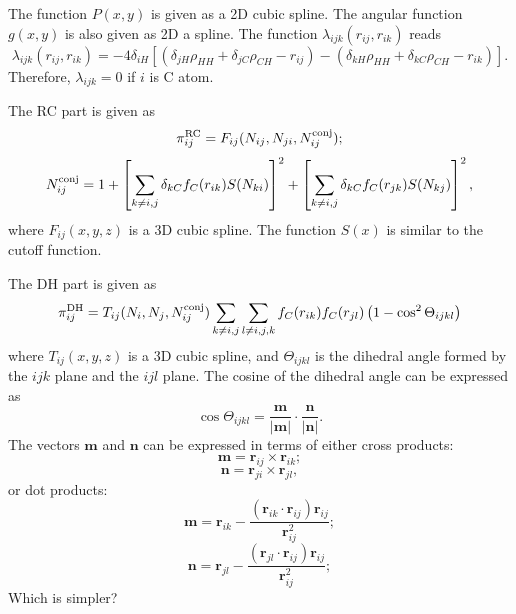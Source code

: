 \documentclass[12pt,a4paper]{report}
\newcommand{\vect}[1]{\boldsymbol{#1}}
\begin{document}
The function $P(x,y)$ is given as a 2D cubic spline. The angular function $g(x,y)$  is also given as 2D a spline. 
The function $\lambda_{ijk}(r_{ij},r_{ik})$ reads
\begin{equation}
\lambda_{ijk}(r_{ij},r_{ik}) =- 4\delta_{iH} 
\left[
  (\delta_{jH}\rho_{HH} + \delta_{jC}\rho_{CH} - r_{ij}) -
  (\delta_{kH}\rho_{HH} + \delta_{kC}\rho_{CH} - r_{ik})
\right].
\end{equation}
Therefore, $\lambda_{ijk}=0$ if $i$ is C atom.

The RC part is given as
\begin{equation}
\pi_{ij}^{\rm RC} = F_{ij}(N_{ij},N_{ji},N_{ij}^{\rm conj});
\end{equation}
\begin{equation}
N_{ij}^{\rm conj} = 1 + 
\left[ \sum_{k\neq i,j} \delta_{kC} f_C(r_{ik}) S(N_{ki})\right]^2 +
\left[ \sum_{k\neq i,j} \delta_{kC} f_C(r_{jk}) S(N_{kj})\right]^2,
\end{equation}
where $F_{ij}(x,y,z)$ is a 3D cubic spline.  The function $S(x)$ is similar to the cutoff function.

The DH part is given as
\begin{equation}
\pi_{ij}^{\rm DH} =T_{ij}(N_i,N_j,N_{ij}^{\rm conj}) 
\sum_{k\neq i,j}\sum_{l\neq i,j,k} f_{C}(r_{ik}) f_{C}(r_{jl})\left(1-\cos^2\Theta_{ijkl}\right)
\end{equation}
where $T_{ij}(x,y,z)$ is a 3D cubic spline, and $\Theta_{ijkl}$ is the dihedral angle formed by the $ijk$ plane and the $ijl$ plane. The cosine of the dihedral angle can be expressed as
\begin{equation}
\cos\Theta_{ijkl} = 
\frac{ \vect{m} } {|  \vect{m} |}
\cdot 
\frac{  \vect{n} } {|  \vect{n} |}.
\end{equation}
The vectors  $\vect{m}$ and  $\vect{n}$ can be expressed in terms of either cross products:
\begin{equation}
\vect{m} = \vect{r}_{ij} \times \vect{r}_{ik};
\end{equation}
\begin{equation}
\vect{n} = \vect{r}_{ji} \times \vect{r}_{jl},
\end{equation}
or dot products:
\begin{equation}
\vect{m} = \vect{r}_{ik} - \frac{(\vect{r}_{ik} \cdot \vect{r}_{ij}) \vect{r}_{ij} }{\vect{r}_{ij}^2};
\end{equation}
\begin{equation}
\vect{n} = \vect{r}_{jl} - \frac{(\vect{r}_{jl} \cdot \vect{r}_{ij}) \vect{r}_{ij} }{\vect{r}_{ij}^2};
\end{equation}
Which is simpler?
\end{document}
